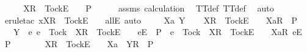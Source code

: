 \ \ \isamarkupfalse%
\ \isamarkupfalse%
\ {\isachardoublequoteopen}{\isacharbrackleft}X{\isacharbrackright}\isactrlsub R\ {\isacharhash}\ {\isacharbrackleft}Tock{\isacharbrackright}\isactrlsub E\ {\isacharhash}\ {\isasymrho}\ {\isasymin}\ P{\isachardoublequoteclose}\isanewline
\ \ \ \ \isamarkupfalse%
\ assms{\isacharparenleft}{}{\isacharparenright}\ calculation\ \isamarkupfalse%
\ TT{\isacharunderscore}def\ TT{}{\isacharunderscore}def\ \isamarkupfalse%
\ auto\ \isanewline
\ \ \ \ \isamarkupfalse%
\ {\isacharparenleft}erule{\isacharunderscore}tac\ x{\isacharequal}{\isachardoublequoteopen}{\isacharbrackleft}X{\isacharbrackright}\isactrlsub R\ {\isacharhash}\ {\isacharbrackleft}Tock{\isacharbrackright}\isactrlsub E\ {\isacharhash}\ {\isasymrho}{\isachardoublequoteclose}\ \ allE{\isacharcomma}\ auto{\isacharparenright}\isanewline
{}\isamarkupfalse%
\isanewline
\ \ \isamarkupfalse%
\ {\isasymrho}\ Xa\ Y\isanewline
\ \ \isamarkupfalse%
\ {\isachardoublequoteopen}{\isacharbrackleft}X{\isacharbrackright}\isactrlsub R\ {\isacharhash}\ {\isacharbrackleft}Tock{\isacharbrackright}\isactrlsub E\ {\isacharhash}\ {\isasymrho}\ {\isacharat}\ {\isacharbrackleft}{\isacharbrackleft}Xa{\isacharbrackright}\isactrlsub R{\isacharbrackright}\ {\isasymin}\ P{\isachardoublequoteclose}\isanewline
\ \ \ {\isachardoublequoteopen}Y\ {\isasyminter}\ {\isacharbraceleft}e{\isachardot}\ e\ {\isasymnoteq}\ Tock\ {\isasymand}\ {\isacharbrackleft}X{\isacharbrackright}\isactrlsub R\ {\isacharhash}\ {\isacharbrackleft}Tock{\isacharbrackright}\isactrlsub E\ {\isacharhash}\ {\isasymrho}\ {\isacharat}\ {\isacharbrackleft}{\isacharbrackleft}e{\isacharbrackright}\isactrlsub E{\isacharbrackright}\ {\isasymin}\ P\ {\isasymor}\ e\ {\isacharequal}\ Tock\ {\isasymand}\ {\isacharbrackleft}X{\isacharbrackright}\isactrlsub R\ {\isacharhash}\ {\isacharbrackleft}Tock{\isacharbrackright}\isactrlsub E\ {\isacharhash}\ {\isasymrho}\ {\isacharat}\ {\isacharbrackleft}{\isacharbrackleft}Xa{\isacharbrackright}\isactrlsub R{\isacharcomma}\ {\isacharbrackleft}e{\isacharbrackright}\isactrlsub E{\isacharbrackright}\ {\isasymin}\ P{\isacharbraceright}\ {\isacharequal}\ {\isacharbraceleft}{\isacharbraceright}{\isachardoublequoteclose}\isanewline
\ \ \isamarkupfalse%
\ \isamarkupfalse%
\ {\isachardoublequoteopen}{\isacharbrackleft}X{\isacharbrackright}\isactrlsub R\ {\isacharhash}\ {\isacharbrackleft}Tock{\isacharbrackright}\isactrlsub E\ {\isacharhash}\ {\isasymrho}\ {\isacharat}\ {\isacharbrackleft}{\isacharbrackleft}Xa\ {\isasymunion}\ Y{\isacharbrackright}\isactrlsub R{\isacharbrackright}\ {\isasymin}\ P{\isachardoublequoteclose}\isanewline

